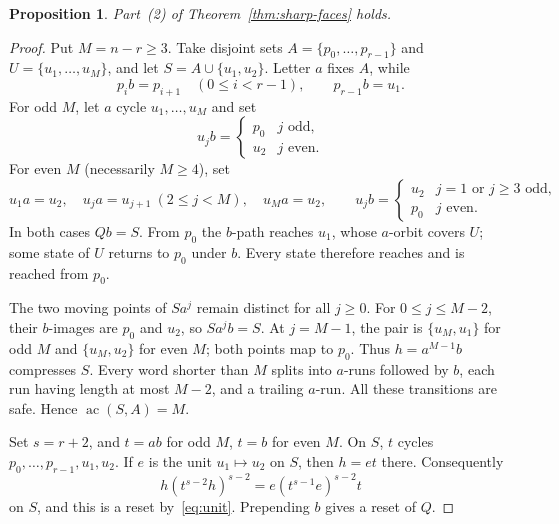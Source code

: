 \documentclass[11pt]{article}
\theoremstyle{definition}
\theoremstyle{plain}
\newtheorem{proposition}[theorem]{Proposition}
\newcommand{\ac}{\operatorname{ac}}
\begin{document}
\begin{proposition}\label{prop:two}
Part~(2) of Theorem~\ref{thm:sharp-faces} holds.
\end{proposition}
\begin{proof}
Put $M=n-r\ge3$. Take disjoint sets $A=\{p_0,\ldots,p_{r-1}\}$ and $U=\{u_1,\ldots,u_M\}$, and let $S=A\cup\{u_1,u_2\}$. Letter $a$ fixes $A$, while
\[
 p_ib=p_{i+1}\quad(0\le i<r-1),\qquad p_{r-1}b=u_1.
\]
For odd $M$, let $a$ cycle $u_1,\ldots,u_M$ and set
\[
 u_jb=\begin{cases}p_0&j\text{ odd},\\u_2&j\text{ even}.\end{cases}
\]
For even $M$ (necessarily $M\ge4$), set
\[
 u_1a=u_2,\quad u_ja=u_{j+1}\ (2\le j<M),\quad u_Ma=u_2,
 \qquad
 u_jb=\begin{cases}u_2&j=1\text{ or }j\ge3\text{ odd},\\p_0&j\text{ even}.\end{cases}
\]
In both cases $Qb=S$. From $p_0$ the $b$-path reaches $u_1$, whose $a$-orbit covers $U$; some state of $U$ returns to $p_0$ under $b$. Every state therefore reaches and is reached from $p_0$.

The two moving points of $Sa^j$ remain distinct for all $j\ge0$. For $0\le j\le M-2$, their $b$-images are $p_0$ and $u_2$, so $Sa^jb=S$. At $j=M-1$, the pair is $\{u_M,u_1\}$ for odd $M$ and $\{u_M,u_2\}$ for even $M$; both points map to $p_0$. Thus $h=a^{M-1}b$ compresses $S$. Every word shorter than $M$ splits into $a$-runs followed by $b$, each run having length at most $M-2$, and a trailing $a$-run. All these transitions are safe. Hence $\ac(S,A)=M$.

Set $s=r+2$, and $t=ab$ for odd $M$, $t=b$ for even $M$. On $S$, $t$ cycles $p_0,\ldots,p_{r-1},u_1,u_2$. If $e$ is the unit $u_1\mapsto u_2$ on $S$, then $h=et$ there. Consequently
\[
 h(t^{s-2}h)^{s-2}=e(t^{s-1}e)^{s-2}t
\]
on $S$, and this is a reset by~\eqref{eq:unit}. Prepending $b$ gives a reset of $Q$.
\end{proof}
\end{document}
